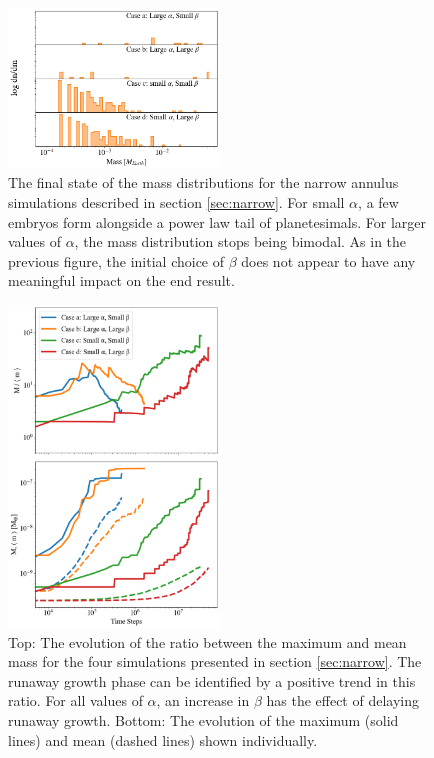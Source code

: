 \begin{figure}
\begin{center}
    \includegraphics[width=0.5\textwidth]{figures/plStip/alpha_beta_mass.png}
    \caption{The final state of the mass distributions for the
      narrow annulus simulations described in section \ref{sec:narrow}. For small
      $\alpha$, a few embryos form alongside a power law tail of
      planetesimals. For larger values of $\alpha$, the mass distribution stops being bimodal. 
      As in the previous figure, the initial choice of $\beta$ does not appear to have any meaningful impact on the end result.
      \label{fig:alpha_beta_mass}}
\end{center}
\end{figure}

\begin{figure}
\begin{center}
    \includegraphics[width=0.5\textwidth]{figures/plStip/alpha_beta_evo.png}
    \caption{Top: The evolution of the ratio between the maximum and mean mass for the four simulations presented
    in section \ref{sec:narrow}. The runaway growth phase can be identified by a positive trend in this ratio. For all values of 
    $\alpha$, an increase in $\beta$ has the effect of delaying runaway growth. Bottom: The evolution of the maximum
    (solid lines) and mean (dashed lines) shown individually.\label{fig:alpha_beta_evo}}
\end{center}
\end{figure}

